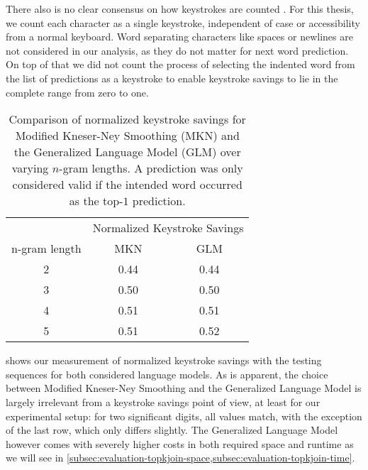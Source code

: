 There also is no clear consensus on how keystrokes are counted
\parencite{Trnka2011}.
For this thesis, we count each character as a single keystroke, independent of
case or accessibility from a normal keyboard.
Word separating characters like spaces or newlines are not considered in our
analysis, as they do not matter for next word prediction.
On top of that we did not count the process of selecting the indented word from
the list of predictions as a keystroke to enable keystroke savings to lie in the
complete range from zero to one.

\begin{table}
  \centering
  \begin{tabular}{ccc}
    \toprule
    & \multicolumn{2}{c}{Normalized Keystroke Savings} \\
    \cmidrule{2-3}
    n-gram length & \hspace{0.8cm}MKN\hspace{0.8cm} & \hspace{0.8cm}GLM\hspace{0.8cm} \\
    \midrule
    2 & 0.44 & 0.44 \\
    3 & 0.50 & 0.50 \\
    4 & 0.51 & 0.51 \\
    5 & 0.51 & 0.52 \\
    \bottomrule
  \end{tabular}
  \caption{Comparison of normalized keystroke savings for Modified Kneser-Ney
    Smoothing (MKN) and the Generalized Language Model (GLM) over varying
    $n$-gram lengths.
    A prediction was only considered valid if the intended word occurred as
    the top-$1$ prediction.}
  \label{tab:evaluation-nkss}
\end{table}

 shows our measurement of normalized keystroke
savings with the testing sequences for both considered language models.
As is apparent, the choice between Modified Kneser-Ney Smoothing and the
Generalized Language Model is largely irrelevant from a keystroke savings point
of view, at least for our experimental setup: for two significant  digits, all
values match, with the exception of the last row, which only differs slightly.
The Generalized Language Model however comes with severely higher costs in both
required space and runtime as we will see in
\cref{subsec:evaluation-topkjoin-space,subsec:evaluation-topkjoin-time}.

\clearpage

